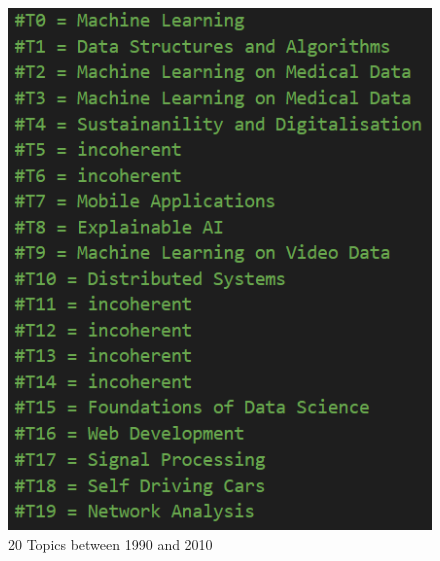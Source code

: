 \documentclass[fleqn,10pt]{SelfArx} %
\begin{document}
\begin{figure}[ht]\centering
	\includegraphics[width=\linewidth]{Figures/before 2010 Topics.png}
	\caption{20 Topics between 1990 and 2010}
	\label{fig:ap2010}
\end{figure}
\end{document}
